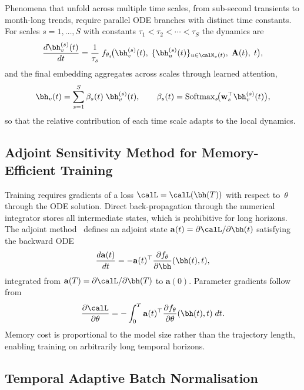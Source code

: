 Phenomena that unfold across multiple time scales, from sub-second transients to month-long trends, require parallel ODE branches with distinct time constants. For scales $s=1,\dots,S$ with constants $\tau_1<\tau_2<\cdots<\tau_S$ the dynamics are
\begin{equation}
\frac{d\bh_v^{(s)}(t)}{dt}
= \frac{1}{\tau_s}\;f_{\theta_s}\!\bigl(
  \bh_v^{(s)}(t),\;\{\bh_u^{(s)}(t)\}_{u\in\calN_v(t)},\;
  \mathbf{A}(t),\;t\bigr),
\label{eq:ct_tgnn_multi}
\end{equation}
and the final embedding aggregates across scales through learned attention,
\begin{equation}
\bh_v(t)
= \sum_{s=1}^{S}\beta_s(t)\;\bh_v^{(s)}(t),
\qquad
\beta_s(t) = \mathrm{Softmax}_s\!\bigl(\mathbf{w}_s^\top\bh_v^{(s)}(t)\bigr),
\label{eq:ct_tgnn_scale_fuse}
\end{equation}
so that the relative contribution of each time scale adapts to the local dynamics.

\subsection{Adjoint Sensitivity Method for Memory-Efficient Training}

Training requires gradients of a loss $\calL=\calL(\bh(T))$ with respect to~$\theta$ through the ODE solution. Direct back-propagation through the numerical integrator stores all intermediate states, which is prohibitive for long horizons. The adjoint method~\cite{Pontryagin1962,Chen2018} defines an adjoint state $\mathbf{a}(t)=\partial\calL/\partial\bh(t)$ satisfying the backward ODE
\begin{equation}
\frac{d\mathbf{a}(t)}{dt}
= -\mathbf{a}(t)^\top\frac{\partial f_\theta}{\partial\bh}(\bh(t),t),
\label{eq:adjoint_ode}
\end{equation}
integrated from $\mathbf{a}(T)=\partial\calL/\partial\bh(T)$ to $\mathbf{a}(0)$. Parameter gradients follow from
\begin{equation}
\frac{\partial\calL}{\partial\theta}
= -\int_0^T \mathbf{a}(t)^\top
  \frac{\partial f_\theta}{\partial\theta}(\bh(t),t)\;dt.
\label{eq:adjoint_param}
\end{equation}
Memory cost is proportional to the model size rather than the trajectory length, enabling training on arbitrarily long temporal horizons.

\subsection{Temporal Adaptive Batch Normalisation}

